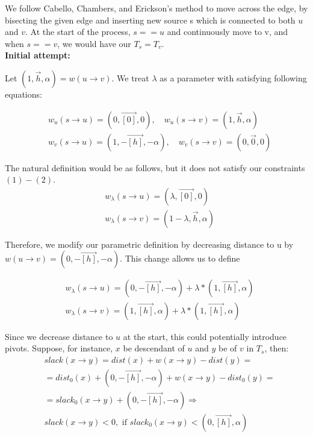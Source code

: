 \documentclass{article}
\begin{document}
We follow Cabello, Chambers, and Erickson's \cite{cabello2013multiple}
method to move across the edge,
by bisecting the given edge and inserting new source s which is connected to
both $u$ and $v$. At the start of the process, $s == u$ and continuously move to
v, and when $s == v$, we would have our $T_s = T_v$. \\

\textbf{Initial attempt:}

Let $(1, \vec{h}, \alpha) = w(u \rightarrow v)$. We treat $\lambda$ as a
parameter with satisfying following equations:

\begin{align}
&w_{u}(s \rightarrow u) = (0, \vec{[0]}, 0), \quad
  w_{u}(s \rightarrow v) = (1, \vec{h}, \alpha) \\
&w_{v}(s \rightarrow u) = (1, -\vec{[h]}, -\alpha), \quad
  w_{v}(s \rightarrow v) = (0, \vec{0}, 0)
\end{align}

The natural definition would be as follows, but it does not satisfy our
constraints $(1)-(2)$.
\begin{align}
&w_{\lambda}(s \rightarrow u) = (\lambda, \vec{[0]}, 0)  \\
&w_{\lambda}(s \rightarrow v) = (1 - \lambda, \vec{h}, \alpha)
\end{align}

Therefore, we modify our parametric definition by decreasing distance to u by
$w(u \rightarrow v) = (0, -\vec{[h]}, -\alpha)$. This change allows us to define

\begin{align}
&w_{\lambda}(s \rightarrow u) = (0, -\vec{[h]}, -\alpha) + 
\lambda * (1, \vec{[h]}, \alpha)  \\
&w_{\lambda}(s \rightarrow v) = (1, \vec{[h]}, \alpha) + 
\lambda * (1, \vec{[h]}, \alpha)
\end{align}

Since we decrease distance to $u$ at the start, this could potentially introduce
pivots. Suppose, for instance, $x$ be descendant of $u$ and $y$ be of $v$ in $T_s$,
then:
\begin{align}
& slack(x \rightarrow y) = dist(x) + w(x \rightarrow y) - dist(y) = \\
& = dist_0(x) + (0, -\vec{[h]}, -\alpha) + w(x \rightarrow y) - dist_0(y) = \\
& = slack_0(x \rightarrow y) + (0, -\vec{[h]}, -\alpha) \Rightarrow \\
& slack(x \rightarrow y) < 0, \text{ if } slack_0(x \rightarrow y) < 
(0,\vec{[h]},\alpha)
\end{align}
\end{document}
